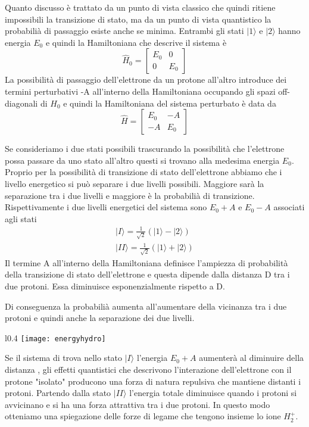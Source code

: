 Quanto discusso \`e trattato da un punto di vista classico che quindi ritiene impossibili la transizione di stato, ma da un punto di vista quantistico la probabili\`a di passaggio esiste anche se minima.  Entrambi gli stati $|1 \rangle$ e $|2 \rangle $ hanno energia $E_0$ e quindi la Hamiltoniana che descrive il sistema \`e 
\begin{equation*}
	\hat{H}_{0} = \left  [\begin{array}{cc}
		E_0 & 0 \\ 0 & E_0
	\end{array}\right]
\end{equation*}
La possibilit\`a di passaggio dell'elettrone da un protone all'altro introduce dei termini perturbativi -A all'interno della Hamiltoniana occupando gli spazi off-diagonali di $H_0$  e quindi la Hamiltoniana del sistema perturbato \`e data da
\newpage
\begin{equation*}
	\hat{H} = \left [ \begin{array}{cc}
		E_0 & -A \\ -A & E_0
	\end{array}\right]
\end{equation*}

Se consideriamo i due stati possibili trascurando la possibilit\`a che l'elettrone possa passare da uno stato all'altro questi si trovano alla medesima energia $E_0$. Proprio per la possibilit\`a di transizione di stato dell'elettrone abbiamo che i livello energetico si pu\`o separare i due livelli possibili. Maggiore sar\`a la separazione tra i due livelli e maggiore \`e la probabili\`a di transizione. Rispettivamente i due livelli energetici del sistema sono $E_0 + A$ e $E_0 -A$ associati agli stati 
\begin{align*}
	|I \rangle = \frac{1 }{\sqrt{2}}(|1 \rangle - |2 \rangle) \\[0.4cm]
	|II \rangle = \frac{1}{\sqrt{2}}(|1 \rangle + |2 \rangle)
\end{align*}
Il termine A all'interno della Hamiltoniana definisce l'ampiezza di probabilit\`a della transizione di stato dell'elettrone e questa dipende dalla distanza D tra i due protoni. Essa diminuisce esponenzialmente rispetto a D. 

Di conseguenza la probabili\`a aumenta all'aumentare della vicinanza tra i due protoni e quindi anche la separazione dei due livelli.

\begin{wrapfigure}{l}{0.4\textwidth} %
    \centering
    \texttt{[image: energyhydro]} %
\end{wrapfigure}
Se il sistema di trova nello stato $|I \rangle$ l'energia $E_0 +A$ aumenter\`a al diminuire della distanza , gli effetti quantistici che descrivono l'interazione dell'elettrone con il protone "isolato" producono una forza di natura repulsiva che mantiene distanti i protoni. 
Partendo dalla stato $|II \rangle$ l'energia totale diminuisce quando i protoni si avvicinano e si ha una forza attrattiva tra i due protoni. 
In questo modo otteniamo una spiegazione delle forze di legame che tengono insieme lo ione $H_2^+$.

